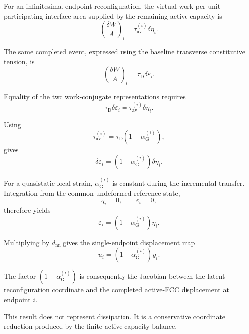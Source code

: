 For an infinitesimal endpoint reconfiguration, the virtual work per unit participating interface area supplied by the remaining active capacity is
\begin{equation}
    \left( \frac{\delta W}{A} \right)_i = \tau_{\mathrm{av}}^{(i)} \delta\eta_i.
\end{equation}

The same completed event, expressed using the baseline transverse constitutive tension, is
\begin{equation}
    \left( \frac{\delta W}{A} \right)_i = \tau_{\mathrm{D}} \delta\varepsilon_i.
\end{equation}

Equality of the two work-conjugate representations requires
\begin{equation}
    \tau_{\mathrm{D}} \delta\varepsilon_i = \tau_{\mathrm{av}}^{(i)} \delta\eta_i.
\end{equation}

Using
\begin{equation}
    \tau_{\mathrm{av}}^{(i)} = \tau_{\mathrm{D}} \left( 1-\alpha_{\mathrm{G}}^{(i)} \right),
\end{equation}
gives
\begin{equation}
    \delta\varepsilon_i = \left( 1-\alpha_{\mathrm{G}}^{(i)} \right) \delta\eta_i.
\end{equation}

For a quasistatic local strain, $\alpha_{\mathrm{G}}^{(i)}$ is constant during the incremental transfer. Integration from the common undeformed reference state,
\begin{equation}
    \eta_i=0, \qquad \varepsilon_i=0,
\end{equation}
therefore yields
\begin{equation}
    \boxed{ \varepsilon_i = \left( 1-\alpha_{\mathrm{G}}^{(i)} \right) \eta_i }.
\end{equation}

Multiplying by $d_{\mathrm{nn}}$ gives the single-endpoint displacement map
\begin{equation}
    \boxed{ u_i = \left( 1-\alpha_{\mathrm{G}}^{(i)} \right) y_i }.
\end{equation}

The factor $(1-\alpha_{\mathrm{G}}^{(i)})$ is consequently the Jacobian between the latent reconfiguration coordinate and the completed active-FCC displacement at endpoint $i$.

This result does not represent dissipation. It is a conservative coordinate reduction produced by the finite active-capacity balance.


